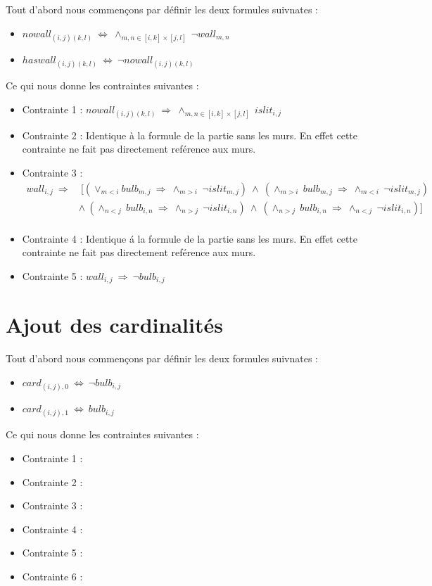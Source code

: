 \documentclass{article}
\begin{document}
Tout d'abord nous commençons par définir les deux formules suivnates :
\begin{itemize}
\item $ nowall_{(i,j)(k,l)} ~ \Leftrightarrow ~ \wedge_{m,n \in [i,k]\times[j,l]} ~ \neg wall_{m,n} $
\item $ haswall_{(i,j)(k,l)} ~ \Leftrightarrow ~ \neg nowall_{(i,j)(k,l)} $\\
\end{itemize}
Ce qui nous donne les contraintes suivantes :
\begin{itemize}
\item Contrainte 1 : $ nowall_{(i,j)(k,l)} ~ \Rightarrow ~ \wedge_{m,n \in [i,k]\times[j,l]} ~ islit_{i,j} $
\item Contrainte 2 : Identique \`a la formule de la partie sans les murs. En effet cette contrainte ne fait pas directement ref\'erence aux murs.
\item Contrainte 3 :
\begin{align}
\nonumber
 wall_{i,j} ~ \Rightarrow &~ [(\vee_{m<i}bulb_{m,j} ~ \Rightarrow ~ \wedge_{m>i} ~ \neg islit_{m,j})~\wedge ~ (\wedge_{m>i} ~ bulb_{m,j} ~ \Rightarrow ~ \wedge_{m<i} ~ \neg islit_{m,j})\\
\nonumber
& \wedge ~ (\wedge_{n<j} ~ bulb_{i,n} ~ \Rightarrow ~ \wedge_{n>j} ~ \neg islit_{i,n})~ \wedge ~ (\wedge_{n>j} ~ bulb_{i,n} ~ \Rightarrow ~ \wedge_{n<j} ~ \neg islit_{i,n})]\\
\nonumber
\end{align}
\item Contrainte 4 : Identique \'a la formule de la partie sans les murs. En effet cette contrainte ne fait pas directement ref\'erence aux murs.
\item Contrainte 5 : $ wall_{i,j}~\Rightarrow~\neg bulb_{i,j} $
\end{itemize}

\section{Ajout des cardinalités}

Tout d'abord nous commençons par définir les deux formules suivnates :
\begin{itemize}
\item $ card_{(i,j),0}~\Leftrightarrow~\neg bulb_{i,j} $
\item $ card_{(i,j),1}~\Leftrightarrow~bulb_{i,j} $\\
\end{itemize}
Ce qui nous donne les contraintes suivantes :
\begin{itemize}
\item Contrainte 1 :
\item Contrainte 2 :
\item Contrainte 3 :
\item Contrainte 4 :
\item Contrainte 5 :
\item Contrainte 6 :
\end{itemize}
\end{document}
